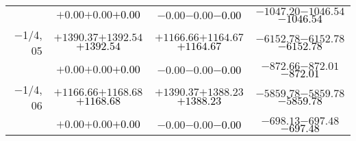 \documentclass[compress]{beamer}
\begin{document}
\begin{frame}
{\begin{tabular}{r | c | c | c}
           & $+0.00$\hspace{0.1 cm}$+0.00$\hspace{0.1 cm}\textcolor{black}{$+0.00$} & $-0.00$\hspace{0.1 cm}$-0.00$\hspace{0.1 cm}\textcolor{black}{$-0.00$} & $-1047.20$\hspace{0.1 cm}$-1046.54$\hspace{0.1 cm}\textcolor{black}{$-1046.54$} \\
$-$1/4, 05 & $+1390.37$\hspace{0.1 cm}$+1392.54$\hspace{0.1 cm}\textcolor{black}{$+1392.54$} & $+1166.66$\hspace{0.1 cm}$+1164.67$\hspace{0.1 cm}\textcolor{black}{$+1164.67$} & $-6152.78$\hspace{0.1 cm}$-6152.78$\hspace{0.1 cm}\textcolor{black}{$-6152.78$} \\
           & $+0.00$\hspace{0.1 cm}$+0.00$\hspace{0.1 cm}\textcolor{black}{$+0.00$} & $-0.00$\hspace{0.1 cm}$-0.00$\hspace{0.1 cm}\textcolor{black}{$-0.00$} & $-872.66$\hspace{0.1 cm}$-872.01$\hspace{0.1 cm}\textcolor{black}{$-872.01$} \\
$-$1/4, 06 & $+1166.66$\hspace{0.1 cm}$+1168.68$\hspace{0.1 cm}\textcolor{black}{$+1168.68$} & $+1390.37$\hspace{0.1 cm}$+1388.23$\hspace{0.1 cm}\textcolor{black}{$+1388.23$} & $-5859.78$\hspace{0.1 cm}$-5859.78$\hspace{0.1 cm}\textcolor{black}{$-5859.78$} \\
           & $+0.00$\hspace{0.1 cm}$+0.00$\hspace{0.1 cm}\textcolor{black}{$+0.00$} & $-0.00$\hspace{0.1 cm}$-0.00$\hspace{0.1 cm}\textcolor{black}{$-0.00$} & $-698.13$\hspace{0.1 cm}$-697.48$\hspace{0.1 cm}\textcolor{black}{$-697.48$} \\
\end{tabular}}
\end{frame}
\end{document}

